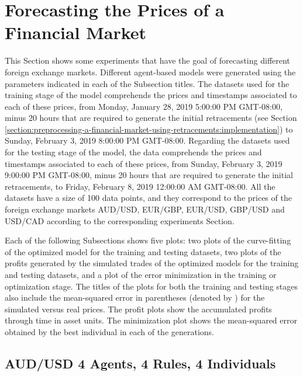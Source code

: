 
\section{Forecasting the Prices of a Financial Market}
\label{section:forecasting-the-prices-of-a-financial-market}

This Section shows some experiments that have the goal of forecasting different
foreign exchange markets. Different agent-based models were generated using the
parameters indicated in each of the Subsection titles. The datasets used for the
training stage of the model comprehends the prices and timestamps associated to
each of these prices, from Monday, January 28, 2019 5:00:00 PM GMT-08:00, minus
20 hours that are required to generate the initial retracements (see Section
\ref{section:preprocessing-a-financial-market-using-retracements:implementation})
to Sunday, February 3, 2019 8:00:00 PM GMT-08:00. Regarding the datasets used
for the testing stage of the model, the data comprehends the prices and
timestamps associated to each of these prices, from Sunday, February 3, 2019
9:00:00 PM GMT-08:00, minus 20 hours that are required to generate the initial
retracements, to Friday, February 8, 2019 12:00:00 AM GMT-08:00. All the
datasets have a size of 100 data points, and they correspond to the prices of
the foreign exchange markets AUD/USD, EUR/GBP, EUR/USD, GBP/USD and USD/CAD
according to the corresponding experiments Section.

Each of the following Subsections shows five plots: two plots of the
curve-fitting of the optimized model for the training and testing datasets, two
plots of the profits generated by the simulated trades of the optimized models
for the training and testing datasets, and a plot of the error minimization in
the training or optimization stage. The titles of the plots for both the
training and testing stages also include the mean-squared error in parentheses
(denoted by \epsilon) for the simulated versus real prices. The profit plots
show the accumulated profits through time in asset units. The minimization plot
shows the mean-squared error obtained by the best individual in each of the
generations.

\subsection{AUD/USD 4 Agents, 4 Rules, 4 Individuals}
\label{results:forecast-aud-usd-4agents-4rules-4individuals}


